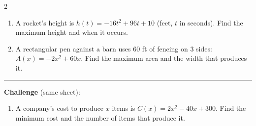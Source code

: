 \documentclass[12pt]{article}
\begin{document}
\begin{multicols}{2}
\begin{enumerate}[label=\textbf{\arabic*.}, start=8, itemsep=3cm]
  \item A rocket's height is $h(t)=-16t^2+96t+10$ (feet, $t$ in seconds). Find the maximum height and when it occurs.
  \item A rectangular pen against a barn uses 60 ft of fencing on 3 sides: $A(x)=-2x^2+60x$. Find the maximum area and the width that produces it.
\end{enumerate}
\end{multicols}

\vspace{0.2cm}\hrule\vspace{0.3cm}
\textbf{Challenge} (same sheet):\\[4pt]
\begin{enumerate}[label=\textbf{\arabic*.}, start=10, itemsep=2.2cm]
  \item A company's cost to produce $x$ items is $C(x)=2x^2-40x+300$. Find the minimum cost and the number of items that produce it.
\end{enumerate}

\newpage
\end{document}
